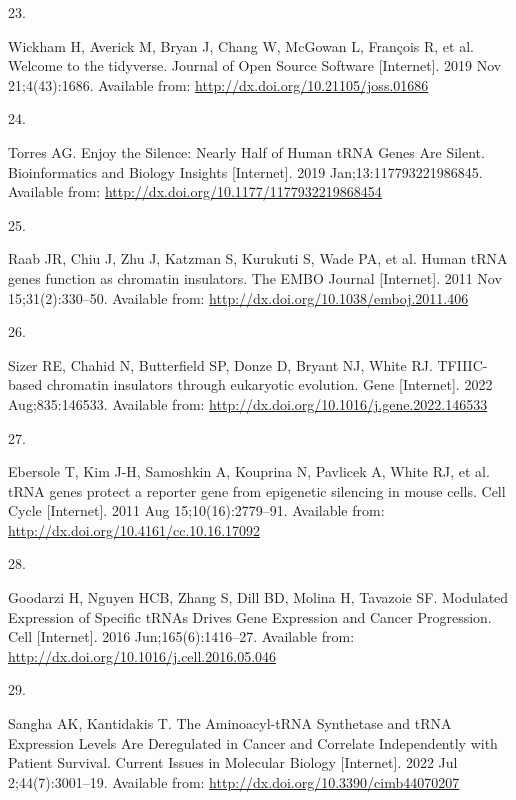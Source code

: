 \documentclass[
  12pt,
]{article}
\newlength{\cslhangindent}
\newlength{\csllabelwidth}
\newlength{\cslentryspacingunit} %
\newenvironment{CSLReferences}[2] %
 {%
  \setlength{\parindent}{0pt}
  \ifodd #1
  \let\oldpar\par
  \def\par{\hangindent=\cslhangindent\oldpar}
  \fi
  \setlength{\parskip}{#2\cslentryspacingunit}
 }%
 {}
\newcommand{\CSLLeftMargin}[1]{\parbox[t]{\csllabelwidth}{#1}}
\newcommand{\CSLRightInline}[1]{\parbox[t]{\linewidth - \csllabelwidth}{#1}\break}
\begin{document}
\begin{CSLReferences}{0}{0}
\leavevmode{}%
\CSLLeftMargin{23. }%
\CSLRightInline{Wickham H, Averick M, Bryan J, Chang W, McGowan L, François R, et al. Welcome to the tidyverse. Journal of Open Source Software {[}Internet{]}. 2019 Nov 21;4(43):1686. Available from: \url{http://dx.doi.org/10.21105/joss.01686}}

\leavevmode{}%
\CSLLeftMargin{24. }%
\CSLRightInline{Torres AG. Enjoy the Silence: Nearly Half of Human tRNA Genes Are Silent. Bioinformatics and Biology Insights {[}Internet{]}. 2019 Jan;13:117793221986845. Available from: \url{http://dx.doi.org/10.1177/1177932219868454}}

\leavevmode{}%
\CSLLeftMargin{25. }%
\CSLRightInline{Raab JR, Chiu J, Zhu J, Katzman S, Kurukuti S, Wade PA, et al. Human tRNA genes function as chromatin insulators. The EMBO Journal {[}Internet{]}. 2011 Nov 15;31(2):330--50. Available from: \url{http://dx.doi.org/10.1038/emboj.2011.406}}

\leavevmode{}%
\CSLLeftMargin{26. }%
\CSLRightInline{Sizer RE, Chahid N, Butterfield SP, Donze D, Bryant NJ, White RJ. TFIIIC-based chromatin insulators through eukaryotic evolution. Gene {[}Internet{]}. 2022 Aug;835:146533. Available from: \url{http://dx.doi.org/10.1016/j.gene.2022.146533}}

\leavevmode{}%
\CSLLeftMargin{27. }%
\CSLRightInline{Ebersole T, Kim J-H, Samoshkin A, Kouprina N, Pavlicek A, White RJ, et al. tRNA genes protect a reporter gene from epigenetic silencing in mouse cells. Cell Cycle {[}Internet{]}. 2011 Aug 15;10(16):2779--91. Available from: \url{http://dx.doi.org/10.4161/cc.10.16.17092}}

\leavevmode{}%
\CSLLeftMargin{28. }%
\CSLRightInline{Goodarzi H, Nguyen HCB, Zhang S, Dill BD, Molina H, Tavazoie SF. Modulated Expression of Specific tRNAs Drives Gene Expression and Cancer Progression. Cell {[}Internet{]}. 2016 Jun;165(6):1416--27. Available from: \url{http://dx.doi.org/10.1016/j.cell.2016.05.046}}

\leavevmode{}%
\CSLLeftMargin{29. }%
\CSLRightInline{Sangha AK, Kantidakis T. The Aminoacyl-tRNA Synthetase and tRNA Expression Levels Are Deregulated in Cancer and Correlate Independently with Patient Survival. Current Issues in Molecular Biology {[}Internet{]}. 2022 Jul 2;44(7):3001--19. Available from: \url{http://dx.doi.org/10.3390/cimb44070207}}

\end{CSLReferences}
\end{document}
